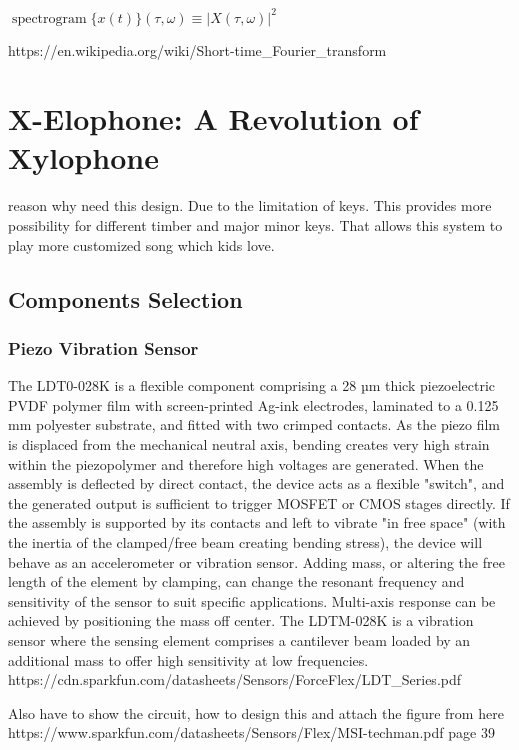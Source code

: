 ${\displaystyle \operatorname {spectrogram} \{x(t)\}(\tau ,\omega )\equiv |X(\tau ,\omega )|^{2}}$
 

https://en.wikipedia.org/wiki/Short-time_Fourier_transform


\section{X-Elophone: A Revolution of Xylophone}

reason why need this design. Due to the limitation of keys. This provides more 
possibility for different timber and major minor keys. That allows this system to 
play more customized song which kids love.

\subsection{Components Selection}

\subsubsection{Piezo Vibration Sensor}
The LDT0-028K is a flexible component comprising a 28 µm thick piezoelectric PVDF
polymer film with screen-printed Ag-ink electrodes, laminated to a 0.125 mm polyester 
substrate, and fitted with two crimped contacts. As the piezo film is displaced from 
the mechanical neutral axis, bending creates very high strain within the piezopolymer 
and therefore high voltages are generated. When the assembly is deflected by direct 
contact, the device acts as a flexible "switch", and the generated output is sufficient 
to trigger MOSFET or CMOS stages directly. If the assembly is supported by its contacts 
and left to vibrate "in free space" (with the inertia of the clamped/free beam creating 
bending stress), the device will behave as an accelerometer or vibration sensor. Adding 
mass, or altering the free length of the element by clamping, can change the resonant 
frequency and sensitivity of the sensor to suit specific applications. Multi-axis response 
can be achieved by positioning the mass off center. The LDTM-028K is a vibration sensor 
where the sensing element comprises a cantilever beam loaded by an additional mass to 
offer high sensitivity at low frequencies. 
https://cdn.sparkfun.com/datasheets/Sensors/ForceFlex/LDT_Series.pdf

Also have to show the circuit, how to design this and attach the figure from here
https://www.sparkfun.com/datasheets/Sensors/Flex/MSI-techman.pdf
page 39

